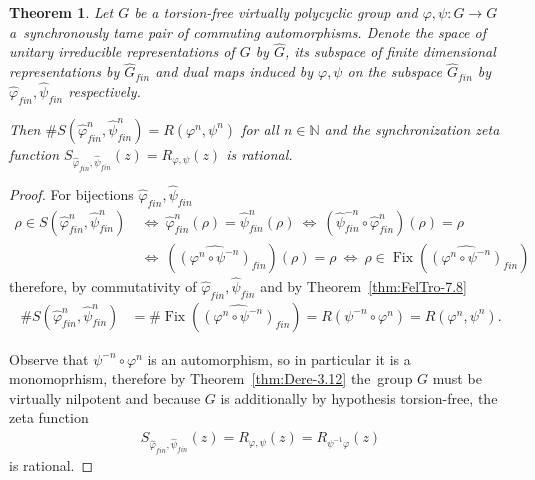\documentclass[oneside]{amsart}
\def\N{\mathbb{N}}
\def\Fix{\operatorname{Fix}}
\newtheorem{thm}{Theorem}
\begin{document}
\begin{thm} \label{thm:synchronization-on-dual-of-virtually-polycyclic=reidemeister}
  Let $G$ be a torsion-free virtually polycyclic group
  and $\varphi, \psi: G \to G$ a~synchronously tame pair of commuting automorphisms.
  Denote the space of unitary irreducible representations of $G$ by $\widehat{G}$,
  its subspace of finite dimensional representations by $\widehat{G}_{fin}$
  and dual maps induced by $\varphi, \psi$ on the subspace $\widehat{G}_{fin}$ by $\widehat{\varphi}_{fin}, \widehat{\psi}_{fin}$ respectively.

  Then $\# S(\widehat{\varphi}_{fin}^n, \widehat{\psi}_{fin}^n) = R(\varphi^n, \psi^n)$ for all $n \in \N$
  and the synchronization zeta function $S_{\widehat{\varphi}_{fin}, \widehat{\psi}_{fin}}(z) = R_{\varphi, \psi}(z)$
  is rational.
\end{thm}
\begin{proof}
  For bijections $\widehat{\varphi}_{fin}, \widehat{\psi}_{fin}$
  \begin{align*}
    \rho \in S(\widehat{\varphi}_{fin}^n, \widehat{\psi}_{fin}^n) \ &\Leftrightarrow \ \widehat{\varphi}_{fin}^n(\rho) = \widehat{\psi}_{fin}^n(\rho)
      \ \Leftrightarrow \ \left( \widehat{\psi}_{fin}^{-n} \circ \widehat{\varphi}_{fin}^n \right)(\rho) = \rho  \\
    &\Leftrightarrow \ \left( \widehat{(\varphi^n \circ \psi^{-n})}_{fin} \right)(\rho) = \rho
      \ \Leftrightarrow \ \rho \in \Fix \left(\widehat{(\varphi^n \circ \psi^{-n})}_{fin} \right)
  \end{align*}
  therefore, by commutativity of $\widehat{\varphi}_{fin}, \widehat{\psi}_{fin}$
  and by Theorem~\ref{thm:FelTro-7.8}
  \begin{align*}
    \# S(\widehat{\varphi}_{fin}^n, \widehat{\psi}_{fin}^n)
      &= \# \Fix \left( \widehat{(\varphi^n \circ \psi^{-n})}_{fin} \right)
      = R(\psi^{-n} \circ \varphi^n) = R(\varphi^n, \psi^n).
  \end{align*}

  Observe that $\psi^{-n} \circ \varphi^n$ is an automorphism, so in particular it is a monomoprhism,
  therefore by Theorem~\ref{thm:Dere-3.12} the~group $G$ must be virtually nilpotent
  and because $G$ is additionally by hypothesis torsion-free, the zeta function
  \begin{align*}
    S_{\widehat{\varphi}_{fin}, \widehat{\psi}_{fin}}(z) = R_{\varphi, \psi}(z) = R_{\psi^{-1}\varphi}(z)
  \end{align*}
  is rational.
\end{proof}
\end{document}
